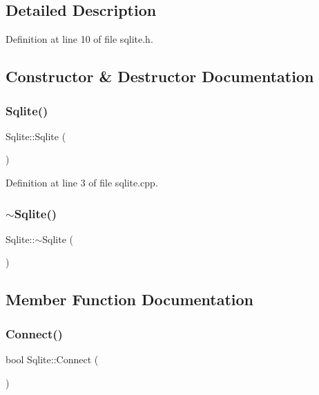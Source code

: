 \subsection{Detailed Description}


Definition at line 10 of file sqlite.\+h.



\subsection{Constructor \& Destructor Documentation}
\mbox{\label{class_sqlite_a8aef4e64531e1522f892c0c6ec69cdff}} 
\subsubsection{\texorpdfstring{Sqlite()}{Sqlite()}}
{\footnotesize\ttfamily Sqlite\+::\+Sqlite (\begin{DoxyParamCaption}{ }\end{DoxyParamCaption})}



Definition at line 3 of file sqlite.\+cpp.

\mbox{\label{class_sqlite_adc35a543dca91edc3ffb90a3825dd54a}} 
\subsubsection{\texorpdfstring{$\sim$Sqlite()}{~Sqlite()}}
{\footnotesize\ttfamily Sqlite\+::$\sim$\+Sqlite (\begin{DoxyParamCaption}{ }\end{DoxyParamCaption})}



\subsection{Member Function Documentation}
\mbox{\label{class_sqlite_aa93509c1e19a7d486f4f38ff4bc78a89}} 
\subsubsection{\texorpdfstring{Connect()}{Connect()}}
{\footnotesize\ttfamily bool Sqlite\+::\+Connect (\begin{DoxyParamCaption}{ }\end{DoxyParamCaption})}



